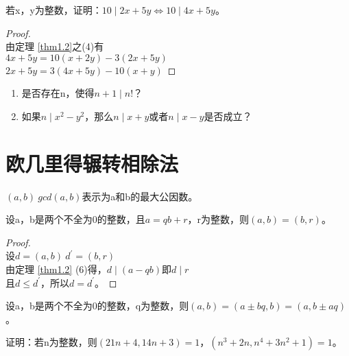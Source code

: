 \documentclass[cn,10pt]{elegantbook}
\begin{document}
\begin{example}
  若x，y为整数，证明：$10 \mid 2x+5y \Leftrightarrow 10 \mid 4x+5y$。
\end{example}
\begin{proof}
\\由定理 \ref{thm1.2}之(4)有
\\$4x+5y = 10(x+2y)-3(2x+5y)$
\\$2x+5y = 3(4x+5y)-10(x+y)$
\end{proof}
\begin{exercise}
  \begin{enumerate}[1)]
    \item 是否存在n，使得$n+1 \mid n!$？
    \item 如果$n \mid x^2 -y^2$，那么$n \mid x+y$或者$n \mid x-y$是否成立？
  \end{enumerate}
\end{exercise}
\begin{note}

\end{note}

\section{欧几里得辗转相除法}
\begin{definition}
  $(a,b) \ gcd(a,b)$表示为a和b的最大公因数。
\end{definition}
\begin{theorem}
  设a，b是两个不全为0的整数，且$a = qb+r $，r为整数，则$(a,b) = (b,r)$。\\
\end{theorem}

\begin{proof}
  \\设$d = (a,b) \ d^{\prime} = (b,r)$
  \\由定理 \ref{thm1.2} (6)得，$d \mid (a-qb)$即$d \mid r$
  \\且$d \leq d^{\prime}$，所以$d = d^{\prime}$。
\end{proof}

\begin{corollary}
  设a，b是两个不全为0的整数，q为整数，则$(a,b)=(a\pm bq,b) = (a, b \pm aq)$。
\end{corollary}

\begin{example}
  证明：若n为整数，则$(21n+4,14n+3) = 1$，$(n^3+2n,n^4+3n^2+1) = 1$。
\end{example}
\end{document}
